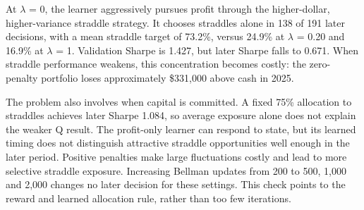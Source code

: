 At \(\lambda\) = 0, the learner aggressively pursues profit through the higher-dollar, higher-variance straddle strategy. It chooses straddles alone in 138 of 191 later decisions, with a mean straddle target of 73.2\%, versus 24.9\% at \(\lambda\) = 0.20 and 16.9\% at \(\lambda\) = 1. Validation Sharpe is 1.427, but later Sharpe falls to 0.671. When straddle performance weakens, this concentration becomes costly: the zero-penalty portfolio loses approximately \$331,000 above cash in 2025.


The problem also involves when capital is committed. A fixed 75\% allocation to straddles achieves later Sharpe 1.084, so average exposure alone does not explain the weaker Q result. The profit-only learner can respond to state, but its learned timing does not distinguish attractive straddle opportunities well enough in the later period. Positive penalties make large fluctuations costly and lead to more selective straddle exposure. Increasing Bellman updates from 200 to 500, 1,000 and 2,000 changes no later decision for these settings. This check points to the reward and learned allocation rule, rather than too few iterations.
